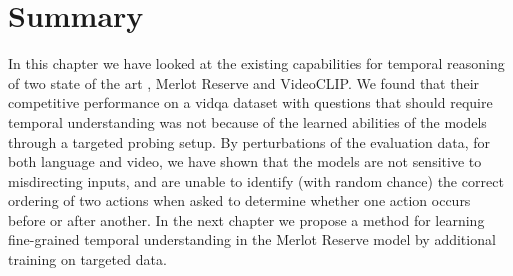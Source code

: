 \section{Summary}
\label{sec:probe_summary}

In this chapter we have looked at the existing capabilities for temporal
reasoning of two state of the art , Merlot Reserve and
VideoCLIP. We found that their competitive performance on a \acrshort{vidqa}
dataset with questions that should require temporal understanding was not
because of the learned abilities of the models through a targeted probing
setup. By perturbations of the evaluation data, for both language and video, we
have shown that the models are not sensitive to misdirecting inputs, and are
unable to identify (with random chance) the correct ordering of two actions
when asked to determine whether one action occurs before or after another. In
the next chapter we propose a method for learning fine-grained temporal
understanding in the Merlot Reserve model by additional training on targeted
data.


% 
% 
% 
% 
